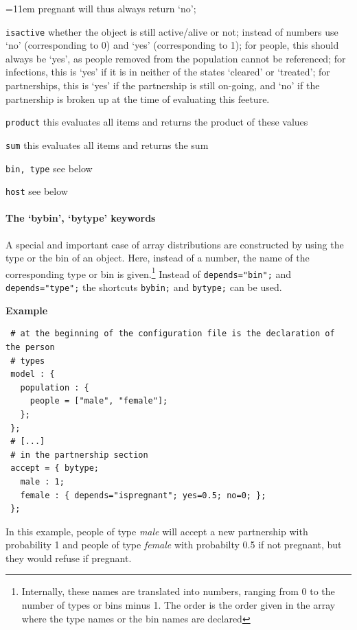 \documentclass[11pt]{article}
\newenvironment{example}{\par\smallskip\noindent\begingroup\small\textbf{\small Example\enskip}}{\endgroup\par\smallskip}
\begin{document}
\begin{list}{}{\small
\renewcommand{\makelabel}{}
\setlength{\itemsep}{0ex}=11em\setlength{\leftmargin}{12em}}
pregnant will thus always return `no';
\item[\tt isactive] whether the object is still active/alive or not; instead of
numbers use `no'
(corresponding to 0) and `yes' (corresponding to 1); for people, this should
always be `yes', as people removed from the population cannot be referenced; for
infections,  this is `yes' if it is in neither of the states `cleared' or 
`treated'; for partnerships, this is `yes' if the partnership is still on-going,
and
`no' if the partnership is broken up at the time of evaluating this feeture.
\item[\tt product] this evaluates all items and returns the product of these
values
\item[\tt sum] this evaluates all items and returns the sum

\item[\tt bin, type] see below
\item[\tt host] see below
\end{list}

\paragraph{The `bybin', `bytype' keywords}

A special and important case of array distributions are constructed by using
the type or the bin of an object. Here, instead of a number, the name of the
corresponding type or bin is given.\footnote{Internally, these names are
translated into numbers, ranging from 0 to the number of types or bins minus 1.
The order is the order given in the array where the type names or the bin names
are declared} Instead of \texttt{depends="bin";} and \texttt{depends="type";}
the shortcuts \texttt{bybin;} and \texttt{bytype;} can be used.
\begin{example}
\begin{verbatim}
 # at the beginning of the configuration file is the declaration of the person
 # types
 model : {
   population : {
     people = ["male", "female"];
   };
 };
 # [...]
 # in the partnership section
 accept = { bytype;
   male : 1; 
   female : { depends="ispregnant"; yes=0.5; no=0; };
 };
\end{verbatim}
In this example, people of type \emph{male} will accept a new partnership
with probability 1 and people of type \emph{female} with probabilty 0.5 if not
pregnant, but they would refuse if pregnant.
\end{example}
\end{document}
